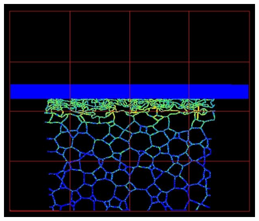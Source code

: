 \documentclass{beamer}
\begin{document}
\begin{frame}
{                      \includegraphics{FIGS/foamCrush40mm_v1_ng_200ms_05.jpg}}\\
      \vspace{12pt}
\end{frame}
\end{document}
